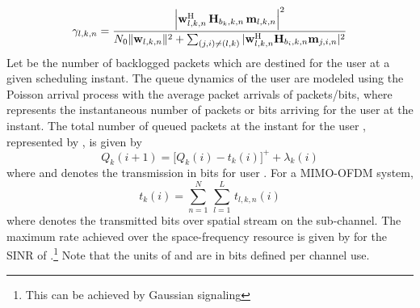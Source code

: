 \begin{equation}\label{eq:SINR}
\gamma_{l,k,n} = \dfrac{\left |\mvec{w}{l,k,n}^\herm \, \mvec{H}{b_k,k,n} \, \mvec{m}{l,k,n} \right |^2}{N_0\|\mvec{w}{l,k,n}\|^2 + \sum_{(j,i) \neq (l,k)} |\mvec{w}{l,k,n}^\herm \mvec{H}{b_i,k,n} \mvec{m}{j,i,n} |^2}
\end{equation}
Let  be the number of backlogged packets which are destined for the user  at a given scheduling instant. The queue dynamics of the user  are modeled using the Poisson arrival process with the average packet arrivals of  packets/bits, where  represents the instantaneous number of packets or bits arriving for the user  at the  instant. The total number of queued packets at the  instant for the user , represented by , is given by
\begin{equation}
Q_k(i+1) = \Big [ Q_k(i) - t_k(i) \Big ]^+ + \lambda_k(i)
\label{eqn-2a}
\end{equation}
where  and  denotes the transmission in bits for user . For a \ac{MIMO}-\ac{OFDM} system,
\begin{equation}
t_k(i) = \sum_{n = 1}^N \, \sum_{l = 1}^L \, t_{l,k,n}(i)
\end{equation}
where  denotes the transmitted bits over  spatial stream on the  sub-channel. The maximum rate achieved over the  space-frequency resource is given by  for the \ac{SINR} of .\footnote{This can be achieved by Gaussian signaling} Note that the units of  and  are in bits defined per channel use. 